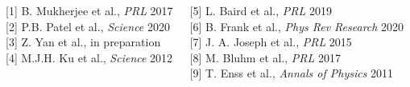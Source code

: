 \documentclass[26pt, paperwidth=36in,paperheight=48in]{tikzposter} %
\newcommand{\myfont}{\fontsize{24}{30}\selectfont}
\begin{document}
\begin{columns} 
	\block[]{\textcolor{BEC1blue}{References}}
	{
	\begin{minipage}{0.2\textwidth}
		\myfont
		{[1]} B. Mukherjee et al., \textit{PRL} 2017\\
		{[2]} P.B. Patel et al., \textit{Science} 2020\\
		{[3]} Z. Yan et al., in preparation\\
		{[4]} M.J.H. Ku et al., \textit{Science} 2012
	\end{minipage}
	\begin{minipage}{0.2\textwidth}
		\myfont
		{[5]} L. Baird et al., \textit{PRL} 2019\\
		{[6]} B. Frank et al.,\textit{ Phys Rev Research} 2020\\
		{[7]} J. A. Joseph et al., \textit{PRL} 2015\\
		{[8]} M. Bluhm et al., \textit{PRL} 2017\\
		{[9]} T. Enss et al., \textit{Annals of Physics} 2011
	\end{minipage}


	} 
	
	
	\block[]{\textcolor{BEC1blue}{Funding}}{

}
\end{columns}
\end{document}
